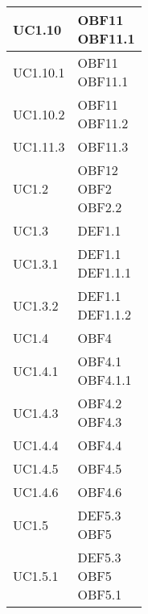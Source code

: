 \documentclass{scalatekids-article}
\begin{document}
\begin{longtable}[H]{|p{5.5cm}|p{5.5cm}|}
  \hline
  UC1.10 & \multiLineCell[t]{OBF11\\OBF11.1\\}\\
  \hline
  UC1.10.1 & \multiLineCell[t]{OBF11\\OBF11.1\\}\\
  \hline
  UC1.10.2 & \multiLineCell[t]{OBF11\\OBF11.2\\}\\
  \hline
  UC1.11.3 & \multiLineCell[t]{OBF11.3\\}\\
  \hline
  UC1.2 & \multiLineCell[t]{OBF12\\OBF2\\OBF2.2\\}\\
  \hline
  UC1.3 & \multiLineCell[t]{DEF1.1\\}\\
  \hline
  UC1.3.1 & \multiLineCell[t]{DEF1.1\\DEF1.1.1\\}\\
  \hline
  UC1.3.2 & \multiLineCell[t]{DEF1.1\\DEF1.1.2\\}\\
  \hline
  UC1.4 & \multiLineCell[t]{OBF4\\}\\
  \hline
  UC1.4.1 & \multiLineCell[t]{OBF4.1\\OBF4.1.1\\}\\
  \hline
  UC1.4.3 & \multiLineCell[t]{OBF4.2\\OBF4.3\\}\\
  \hline
  UC1.4.4 & \multiLineCell[t]{OBF4.4\\}\\
  \hline
  UC1.4.5 & \multiLineCell[t]{OBF4.5\\}\\
  \hline
  UC1.4.6 & \multiLineCell[t]{OBF4.6\\}\\
  \hline
  UC1.5 & \multiLineCell[t]{DEF5.3\\OBF5\\}\\
  \hline
  UC1.5.1 & \multiLineCell[t]{DEF5.3\\OBF5\\OBF5.1\\}\\

\end{longtable}
\end{document}
